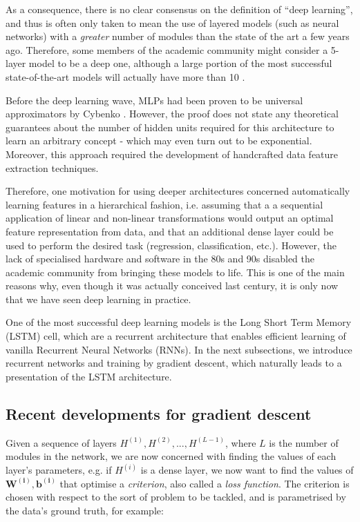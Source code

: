 \documentclass[pdftex,11pt,a4paper]{article}
\theoremstyle{definition}
\theoremstyle{remark}
\newcommand*{\V}[1]{\mathbf{#1}}%
\begin{document}
\par As a consequence, there is no clear consensus on the definition of ``deep learning'', and thus is often only taken to mean the use of layered models (such as neural networks) with a \textit{greater} number of modules than the state of the art a few years ago. Therefore, some members of the academic community might consider a 5-layer model to be a deep one, although a large portion of the most successful state-of-the-art models will actually have more than 10 \cite{Szegedy,Simonyan2015}.

\par Before the deep learning wave, MLPs had been proven to be universal approximators by Cybenko \cite{Cybenko1993}. However, the proof does not state any theoretical guarantees about the number of hidden units required for this architecture to learn an arbitrary concept - which may even turn out to be exponential. Moreover, this approach required the development of handcrafted data feature extraction techniques. 

\par Therefore, one motivation for using deeper architectures concerned automatically learning features in a hierarchical fashion, i.e. assuming that a a sequential application of linear and non-linear transformations would output an optimal feature representation from data, and that an additional dense layer could be used to perform the desired task (regression, classification, etc.). However, the lack of specialised hardware and software in the 80s and 90s disabled the academic community from bringing these models to life. This is one of the main reasons why, even though it was actually conceived last century, it is only now that we have seen deep learning in practice.

\par One of the most successful deep learning models is the Long Short Term Memory (LSTM) cell, which are a recurrent architecture that enables efficient learning of vanilla Recurrent Neural Networks (RNNs). In the next subsections, we introduce recurrent networks and training by gradient descent, which naturally leads to a presentation of the LSTM architecture.


\subsection{Recent developments for gradient descent}

Given a sequence of layers $H^{(1)}, H^{(2)}, ..., H^{(L-1)}$, where $L$ is the number of modules in the network, we are now concerned with finding the values of each layer's parameters, e.g. if $H^{(i)}$ is a dense layer, we now want to find the values of $\V{W^{(i)}, b^{(i)}}$ that optimise a \textit{criterion}, also called a \textit{loss function}. The criterion is chosen with respect to the sort of problem to be tackled, and is parametrised by the data's ground truth, for example:
\end{document}
